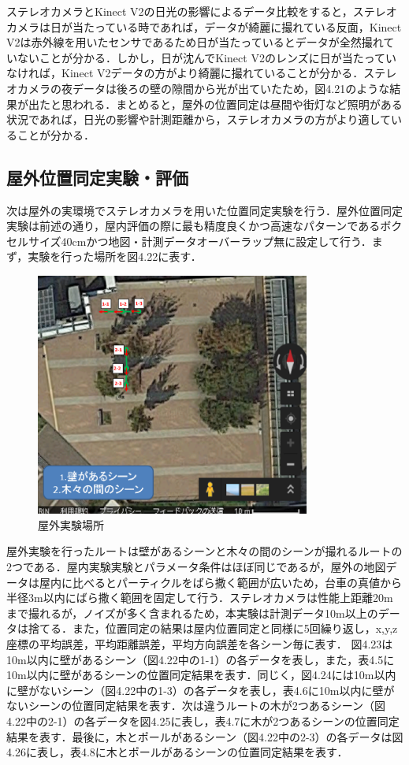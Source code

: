 ステレオカメラとKinect V2の日光の影響によるデータ比較をすると，ステレオカメラは日が当たっている時であれば，データが綺麗に撮れている反面，Kinect V2は赤外線を用いたセンサであるため日が当たっているとデータが全然撮れていないことが分かる．しかし，日が沈んでKinect V2のレンズに日が当たっていなければ，Kinect V2データの方がより綺麗に撮れていることが分かる．ステレオカメラの夜データは後ろの壁の隙間から光が出ていたため，図4.21のような結果が出たと思われる．まとめると，屋外の位置同定は昼間や街灯など照明がある状況であれば，日光の影響や計測距離から，ステレオカメラの方がより適していることが分かる．
\subsection{屋外位置同定実験・評価}
次は屋外の実環境でステレオカメラを用いた位置同定実験を行う．屋外位置同定実験は前述の通り，屋内評価の際に最も精度良くかつ高速なパターンであるボクセルサイズ40cmかつ地図・計測データオーバーラップ無に設定して行う．まず，実験を行った場所を図4.22に表す．\par
%
\begin{figure}[htbp]
  \begin{center}
   \includegraphics[height=80mm]{figure/屋外実験場所.eps}
   \caption{屋外実験場所}
   \label{屋外実験場所}
  \end{center}
\end{figure}
%
屋外実験を行ったルートは壁があるシーンと木々の間のシーンが撮れるルートの2つである．屋内実験実験とパラメータ条件はほぼ同じであるが，屋外の地図データは屋内に比べるとパーティクルをばら撒く範囲が広いため，台車の真値から半径3m以内にばら撒く範囲を固定して行う．ステレオカメラは性能上距離20mまで撮れるが，ノイズが多く含まれるため，本実験は計測データ10m以上のデータは捨てる．また，位置同定の結果は屋内位置同定と同様に5回繰り返し，x,y,z座標の平均誤差，平均距離誤差，平均方向誤差を各シーン毎に表す．
図4.23は10m以内に壁があるシーン（図4.22中の1-1）の各データを表し，また，表4.5に10m以内に壁があるシーンの位置同定結果を表す．同じく，図4.24には10m以内に壁がないシーン（図4.22中の1-3）の各データを表し，表4.6に10m以内に壁がないシーンの位置同定結果を表す．次は違うルートの木が2つあるシーン（図4.22中の2-1）の各データを図4.25に表し，表4.7に木が2つあるシーンの位置同定結果を表す．最後に，木とポールがあるシーン（図4.22中の2-3）の各データは図4.26に表し，表4.8に木とポールがあるシーンの位置同定結果を表す．



